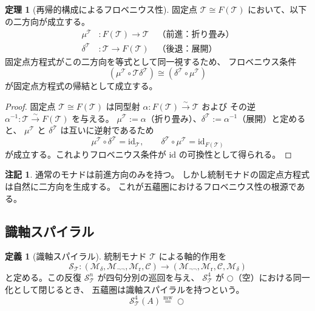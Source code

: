 \documentclass[11pt,a4paper]{article}
\theoremstyle{definition}
\newtheorem{definition}{定義}[section]
\newtheorem{theorem}{定理}[section]
\newtheorem{remark}{注記}[section]
\newcommand{\id}{\mathrm{id}}
\newcommand{\Mdelta}{\mathcal{M}_{\delta}}
\newcommand{\Mneg}{\mathcal{M}_{\neg\neg}}
\newcommand{\Mr}{\mathcal{M}_{\mathrm{r}}}
\newcommand{\Mc}{\mathcal{C}}
\newcommand{\T}{\mathcal{T}}
\newcommand{\SpiralT}{\mathcal{S}_{\mathcal{T}}}
\newcommand{\fold}{\mu}
\newcommand{\unfold}{\delta}
\begin{document}
\begin{theorem}[再帰的構成によるフロベニウス性]
固定点 $\T \cong F(\T)$ において、以下の二方向が成立する。
\begin{align}
\fold^\T &: F(\T) \to \T \quad \text{（前進：折り畳み）} \\
\unfold^\T &: \T \to F(\T) \quad \text{（後退：展開）}
\end{align}
固定点方程式がこの二方向を等式として同一視するため、
フロベニウス条件
\begin{equation}
(\fold^\T \circ \T\unfold^\T) \cong (\unfold^\T \circ \fold^\T)
\end{equation}
が固定点方程式の帰結として成立する。
\end{theorem}
\begin{proof}
固定点 $\T \cong F(\T)$ は同型射 $\alpha : F(\T) \xrightarrow{\sim} \T$ および
その逆 $\alpha^{-1} : \T \xrightarrow{\sim} F(\T)$ を与える。
$\fold^\T := \alpha$（折り畳み）、$\unfold^\T := \alpha^{-1}$（展開）と定めると、
$\fold^\T$ と $\unfold^\T$ は互いに逆射であるため
\begin{equation}
\fold^\T \circ \unfold^\T = \id_{\T}, \qquad
\unfold^\T \circ \fold^\T = \id_{F(\T)}
\end{equation}
が成立する。これよりフロベニウス条件が $\id$ の可換性として得られる。
\end{proof}

\begin{remark}
通常のモナドは前進方向のみを持つ。
しかし統制モナドの固定点方程式は自然に二方向を生成する。
これが五蘊圏におけるフロベニウス性の根源である。
\end{remark}

\subsection{識軸スパイラル}

\begin{definition}[識軸スパイラル]
統制モナド $\T$ による軸的作用を
\begin{equation}
\SpiralT : (\Mdelta, \Mneg, \Mr, \Mc) \longrightarrow 
             (\Mneg, \Mr, \Mc, \Mdelta)
\end{equation}
と定める。この反復 $\SpiralT^n$ が四句分別の巡回を与え、
$\SpiralT^4$ が $\bigcirc$（空）における同一化として閉じるとき、
五蘊圏は識軸スパイラルを持つという。
\begin{equation}
\SpiralT^4(A) \stackrel{\mathrm{mw}}{=} \bigcirc
\end{equation}
\end{definition}
\end{document}
